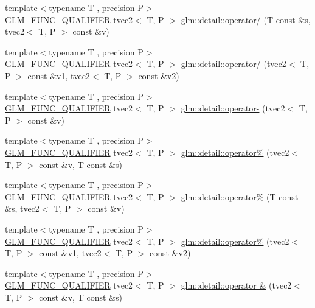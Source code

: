\begin{DoxyCompactItemize}
{\footnotesize template$<$typename T , precision P$>$ }\\\hyperlink{setup_8hpp_a33fdea6f91c5f834105f7415e2a64407}{G\+L\+M\+\_\+\+F\+U\+N\+C\+\_\+\+Q\+U\+A\+L\+I\+F\+I\+ER} tvec2$<$ T, P $>$ \hyperlink{namespaceglm_1_1detail_a5818d0c56a5bb3ce6a4ac31ecc9086d1}{glm\+::detail\+::operator/} (T const \&s, tvec2$<$ T, P $>$ const \&v)
\item 
{\footnotesize template$<$typename T , precision P$>$ }\\\hyperlink{setup_8hpp_a33fdea6f91c5f834105f7415e2a64407}{G\+L\+M\+\_\+\+F\+U\+N\+C\+\_\+\+Q\+U\+A\+L\+I\+F\+I\+ER} tvec2$<$ T, P $>$ \hyperlink{namespaceglm_1_1detail_a68ef5807ed920f1ca0a60e53a1eef4f7}{glm\+::detail\+::operator/} (tvec2$<$ T, P $>$ const \&v1, tvec2$<$ T, P $>$ const \&v2)
\item 
{\footnotesize template$<$typename T , precision P$>$ }\\\hyperlink{setup_8hpp_a33fdea6f91c5f834105f7415e2a64407}{G\+L\+M\+\_\+\+F\+U\+N\+C\+\_\+\+Q\+U\+A\+L\+I\+F\+I\+ER} tvec2$<$ T, P $>$ \hyperlink{namespaceglm_1_1detail_a9dfe76bfce63a4082ee4db0f94f1213a}{glm\+::detail\+::operator-\/} (tvec2$<$ T, P $>$ const \&v)
\item 
{\footnotesize template$<$typename T , precision P$>$ }\\\hyperlink{setup_8hpp_a33fdea6f91c5f834105f7415e2a64407}{G\+L\+M\+\_\+\+F\+U\+N\+C\+\_\+\+Q\+U\+A\+L\+I\+F\+I\+ER} tvec2$<$ T, P $>$ \hyperlink{namespaceglm_1_1detail_afaab1d1a5387b4dc1d1d76ca1901ec1f}{glm\+::detail\+::operator\%} (tvec2$<$ T, P $>$ const \&v, T const \&s)
\item 
{\footnotesize template$<$typename T , precision P$>$ }\\\hyperlink{setup_8hpp_a33fdea6f91c5f834105f7415e2a64407}{G\+L\+M\+\_\+\+F\+U\+N\+C\+\_\+\+Q\+U\+A\+L\+I\+F\+I\+ER} tvec2$<$ T, P $>$ \hyperlink{namespaceglm_1_1detail_a85ecf498edf9ed1fb0fa380bb0cb9c30}{glm\+::detail\+::operator\%} (T const \&s, tvec2$<$ T, P $>$ const \&v)
\item 
{\footnotesize template$<$typename T , precision P$>$ }\\\hyperlink{setup_8hpp_a33fdea6f91c5f834105f7415e2a64407}{G\+L\+M\+\_\+\+F\+U\+N\+C\+\_\+\+Q\+U\+A\+L\+I\+F\+I\+ER} tvec2$<$ T, P $>$ \hyperlink{namespaceglm_1_1detail_a81dcbbb630e200aadddcb428dd82bb29}{glm\+::detail\+::operator\%} (tvec2$<$ T, P $>$ const \&v1, tvec2$<$ T, P $>$ const \&v2)
\item 
{\footnotesize template$<$typename T , precision P$>$ }\\\hyperlink{setup_8hpp_a33fdea6f91c5f834105f7415e2a64407}{G\+L\+M\+\_\+\+F\+U\+N\+C\+\_\+\+Q\+U\+A\+L\+I\+F\+I\+ER} tvec2$<$ T, P $>$ \hyperlink{namespaceglm_1_1detail_ad3c0b5562d9727de820614666cf0e8f8}{glm\+::detail\+::operator \&} (tvec2$<$ T, P $>$ const \&v, T const \&s)

\end{DoxyCompactItemize}
